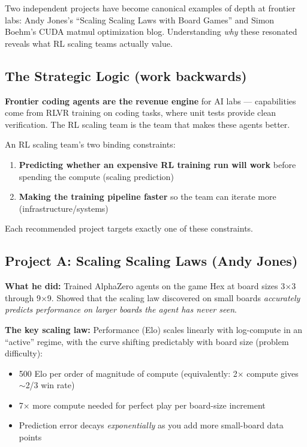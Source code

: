\begin{bluf}
Two independent projects have become canonical examples of depth at frontier labs: Andy Jones's ``Scaling Scaling Laws with Board Games'' and Simon Boehm's CUDA matmul optimization blog. Understanding \textit{why} these resonated reveals what RL scaling teams actually value.
\end{bluf}

\subsection{The Strategic Logic (work backwards)}

\textbf{Frontier coding agents are the revenue engine} for AI labs --- capabilities come from RLVR training on coding tasks, where unit tests provide clean verification. The RL scaling team is the team that makes these agents better.

An RL scaling team's two binding constraints:
\begin{enumerate}
  \item \textbf{Predicting whether an expensive RL training run will work} before spending the compute (scaling prediction)
  \item \textbf{Making the training pipeline faster} so the team can iterate more (infrastructure/systems)
\end{enumerate}

Each recommended project targets exactly one of these constraints.

\subsection{Project A: Scaling Scaling Laws (Andy Jones)}

\textbf{What he did:} Trained AlphaZero agents on the game Hex at board sizes 3$\times$3 through 9$\times$9. Showed that the scaling law discovered on small boards \textit{accurately predicts performance on larger boards the agent has never seen}.

\textbf{The key scaling law:} Performance (Elo) scales linearly with log-compute in an ``active'' regime, with the curve shifting predictably with board size (problem difficulty):

\begin{itemize}
  \item 500 Elo per order of magnitude of compute (equivalently: 2$\times$ compute gives $\sim$2/3 win rate)
  \item 7$\times$ more compute needed for perfect play per board-size increment
  \item Prediction error decays \textit{exponentially} as you add more small-board data points
\end{itemize}

